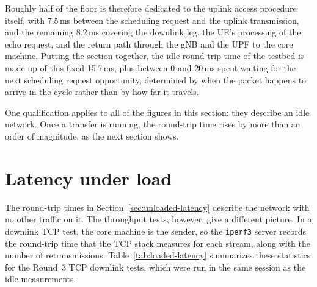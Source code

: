 Roughly half of the floor is therefore dedicated to the uplink access procedure itself, with 7.5\,ms between the scheduling request and the uplink transmission, and the remaining 8.2\,ms covering the downlink leg, the \gls{UE}'s processing of the echo request, and the return path through the \gls{gNB} and the \gls{UPF} to the core machine. Putting the section together, the idle round-trip time of the testbed is made up of this fixed 15.7\,ms, plus between 0 and 20\,ms spent waiting for the next scheduling request opportunity, determined by when the packet happens to arrive in the cycle rather than by how far it travels.

One qualification applies to all of the figures in this section: they describe an idle network.
Once a transfer is running, the round-trip time rises by more than an order of magnitude, as the next section shows.

\section{Latency under load}
\label{sec:bufferbloat}

The round-trip times in Section~\ref{sec:unloaded-latency} describe the network with no other traffic on it. The throughput tests, however, give a different picture. In a downlink TCP test, the core machine is the sender, so the \texttt{iperf3} server records the round-trip time that the TCP stack measures for each stream, along with the number of retransmissions. Table~\ref{tab:loaded-latency} summarizes these statistics for the Round~3 TCP downlink tests, which were run in the same session as the idle measurements.


